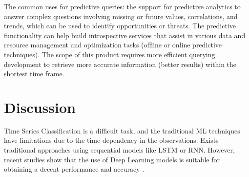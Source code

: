 The common uses for predictive queries: the support for predictive analytics to answer complex questions involving missing or future values, correlations, and trends, which can be used to identify opportunities or threats. The predictive functionality can help build introspective services that assist in various data and resource management and optimization tasks (offline or online predictive techniques). 
The scope of this product requires more efficient querying development to retrieve more accurate information (better results) within the shortest time frame.

\section{Discussion}
Time Series Classification is a difficult task, and the traditional ML techniques have limitations due to the time dependency in the observations. Exists traditional approaches using sequential models like LSTM or RNN. However, recent studies show that the use of Deep Learning models is suitable for obtaining a decent performance and accuracy \cite{Fawaz2019}. 
